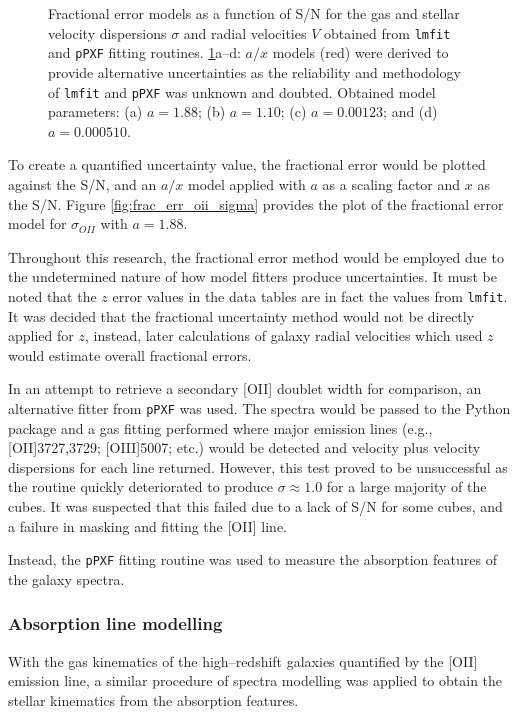\documentclass[12pt, twocolumn, nofootinbib]{revtex4-1}    %
\begin{document}
\begin{figure}
{  \label{fig:frac_err_stellar_vel}
  }
\captionsetup{justification=raggedright}
\caption[Fractional uncertainties]{Fractional error models as a function of S/N for the gas and stellar velocity dispersions $\sigma$ and radial velocities $V$ obtained from \texttt{lmfit} and \texttt{pPXF} fitting routines. \ref{fig:fractional_errors}a--d: $a/x$ models (red) were derived to provide alternative uncertainties as the reliability and methodology of \texttt{lmfit} and \texttt{pPXF} was unknown and doubted. Obtained model parameters: (a) $a=1.88$; (b) $a=1.10$; (c) $a=0.00123$; and (d) $a=0.000510$.}
\label{fig:fractional_errors}
\end{figure}

To create a quantified uncertainty value, the fractional error would be plotted against the S/N, and an $a/x$ model applied with $a$ as a scaling factor and $x$ as the S/N. Figure \ref{fig:frac_err_oii_sigma} provides the plot of the fractional error model for $\sigma_{OII}$ with $a=1.88$. 

Throughout this research, the fractional error method would be employed due to the undetermined nature of how model fitters produce uncertainties. It must be noted that the $z$ error values in the data tables are in fact the values from \texttt{lmfit}. It was decided that the fractional uncertainty method would not be directly applied for $z$, instead, later calculations of galaxy radial velocities which used $z$ would estimate overall fractional errors.

In an attempt to retrieve a secondary [OII] doublet width for comparison, an alternative fitter from \texttt{pPXF} was used. The spectra would be passed to the Python package and a gas fitting performed where major emission lines (e.g., [OII]3727,3729; [OIII]5007; etc.) would be detected and velocity plus velocity dispersions for each line returned. However, this test proved to be unsuccessful as the routine quickly deteriorated to produce $\sigma\approx1.0$ for a large majority of the cubes. It was suspected that this failed due to a lack of S/N for some cubes, and a failure in masking and fitting the [OII] line.

Instead, the \texttt{pPXF} fitting routine was used to measure the absorption features of the galaxy spectra. 

\vspace{2ex} %
\subsubsection{Absorption line modelling}
\noindent
With the gas kinematics of the high--redshift galaxies quantified by the [OII] emission line, a similar procedure of spectra modelling was applied to obtain the stellar kinematics from the absorption features.
\end{document}
